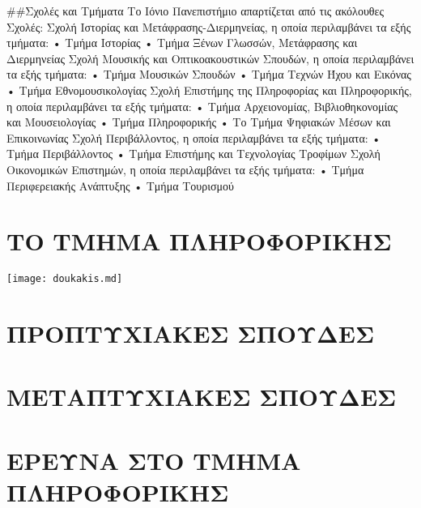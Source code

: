 \#\#Σχολές και Τμήματα Το Ιόνιο Πανεπιστήμιο απαρτίζεται από τις
ακόλουθες Σχολές: Σχολή Ιστορίας και Μετάφρασης-Διερμηνείας, η οποία
περιλαμβάνει τα εξής τμήματα: • Τμήμα Ιστορίας • Τμήμα Ξένων Γλωσσών,
Μετάφρασης και Διερμηνείας Σχολή Μουσικής και Οπτικοακουστικών Σπουδών,
η οποία περιλαμβάνει τα εξής τμήματα: • Τμήμα Μουσικών Σπουδών • Τμήμα
Τεχνών Ήχου και Εικόνας • Τμήμα Εθνομουσικολογίας Σχολή Επιστήμης της
Πληροφορίας και Πληροφορικής, η οποία περιλαμβάνει τα εξής τμήματα: •
Τμήμα Aρχειονομίας, Bιβλιοθηκονομίας και Μουσειολογίας • Τμήμα
Πληροφορικής • Το Τμήμα Ψηφιακών Μέσων και Επικοινωνίας Σχολή
Περιβάλλοντος, η οποία περιλαμβάνει τα εξής τμήματα: • Τμήμα
Περιβάλλοντος • Τμήμα Επιστήμης και Τεχνολογίας Τροφίμων Σχολή
Οικονομικών Επιστημών, η οποία περιλαμβάνει τα εξής τμήματα: • Τμήμα
Περιφερειακής Ανάπτυξης • Τμήμα Τουρισμού

\hypertarget{ux3c4ux3bf-ux3c4ux3bcux3b7ux3bcux3b1-ux3c0ux3bbux3b7ux3c1ux3bfux3c6ux3bfux3c1ux3b9ux3baux3b7ux3c3}{%
\section{ΤΟ ΤΜΗΜΑ
ΠΛΗΡΟΦΟΡΙΚΗΣ}\label{ux3c4ux3bf-ux3c4ux3bcux3b7ux3bcux3b1-ux3c0ux3bbux3b7ux3c1ux3bfux3c6ux3bfux3c1ux3b9ux3baux3b7ux3c3}}

\texttt{[image: doukakis.md]}

\hypertarget{ux3c0ux3c1ux3bfux3c0ux3c4ux3c5ux3c7ux3b9ux3b1ux3baux3b5ux3c3-ux3c3ux3c0ux3bfux3c5ux3b4ux3b5ux3c3}{%
\section{ΠΡΟΠΤΥΧΙΑΚΕΣ
ΣΠΟΥΔΕΣ}\label{ux3c0ux3c1ux3bfux3c0ux3c4ux3c5ux3c7ux3b9ux3b1ux3baux3b5ux3c3-ux3c3ux3c0ux3bfux3c5ux3b4ux3b5ux3c3}}

\hypertarget{ux3bcux3b5ux3c4ux3b1ux3c0ux3c4ux3c5ux3c7ux3b9ux3b1ux3baux3b5ux3c3-ux3c3ux3c0ux3bfux3c5ux3b4ux3b5ux3c3}{%
\section{ΜΕΤΑΠΤΥΧΙΑΚΕΣ
ΣΠΟΥΔΕΣ}\label{ux3bcux3b5ux3c4ux3b1ux3c0ux3c4ux3c5ux3c7ux3b9ux3b1ux3baux3b5ux3c3-ux3c3ux3c0ux3bfux3c5ux3b4ux3b5ux3c3}}

\hypertarget{ux3b5ux3c1ux3b5ux3c5ux3bdux3b1-ux3c3ux3c4ux3bf-ux3c4ux3bcux3b7ux3bcux3b1-ux3c0ux3bbux3b7ux3c1ux3bfux3c6ux3bfux3c1ux3b9ux3baux3b7ux3c3}{%
\section{ΕΡΕΥΝΑ ΣΤΟ ΤΜΗΜΑ
ΠΛΗΡΟΦΟΡΙΚΗΣ}\label{ux3b5ux3c1ux3b5ux3c5ux3bdux3b1-ux3c3ux3c4ux3bf-ux3c4ux3bcux3b7ux3bcux3b1-ux3c0ux3bbux3b7ux3c1ux3bfux3c6ux3bfux3c1ux3b9ux3baux3b7ux3c3}}

